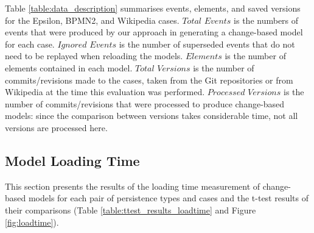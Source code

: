   Table \ref{table:data_description} summarises events, elements, and saved versions for the Epsilon, BPMN2, and Wikipedia cases. $Total$ $Events$ is the numbers of events that were produced by our approach in generating a change-based model for each case. $Ignored$ $Events$ is the number of superseded events that do not need to be replayed when reloading the models. $Elements$ is the number of elements contained in each model. $Total$ $Versions$ is the number of commits/revisions made to the cases, taken from the Git repositories or from Wikipedia at the time this evaluation was performed. $Processed$ $Versions$ is the number of commits/revisions that were processed to produce change-based models: since the comparison between versions takes considerable time, not all versions are processed here.
  
  \subsection{Model Loading Time}
  \label{subsec:loading_time_test}
  This section presents the results of the loading time measurement of change-based models for each pair of persistence types and cases and the t-test results of their comparisons (Table \ref{table:ttest_results_loadtime} and Figure \ref{fig:loadtime}).
  
